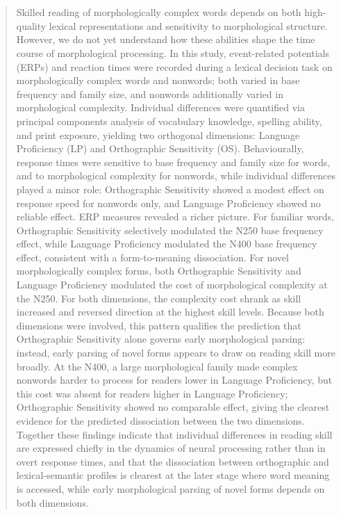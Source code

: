 \documentclass[utf8]{FrontiersinHarvard} %
\begin{document}
	
\begin{abstract}
		
	\section{}
	Skilled reading of morphologically complex words depends on both high-quality lexical representations and sensitivity to morphological structure. However, we do not yet understand how these abilities shape the time course of morphological processing. In this study, event-related potentials (ERPs) and reaction times were recorded during a lexical decision task on morphologically complex words and nonwords; both varied in base frequency and family size, and nonwords additionally varied in morphological complexity. Individual differences were quantified via principal components analysis of vocabulary knowledge, spelling ability, and print exposure, yielding two orthogonal dimensions: Language Proficiency (LP) and Orthographic Sensitivity (OS). Behaviourally, response times were sensitive to base frequency and family size for words, and to morphological complexity for nonwords, while individual differences played a minor role: Orthographic Sensitivity showed a modest effect on response speed for nonwords only, and Language Proficiency showed no reliable effect. ERP measures revealed a richer picture. For familiar words, Orthographic Sensitivity selectively modulated the N250 base frequency effect, while Language Proficiency modulated the N400 base frequency effect, consistent with a form-to-meaning dissociation. For novel morphologically complex forms, both Orthographic Sensitivity and Language Proficiency modulated the cost of morphological complexity at the N250. For both dimensions, the complexity cost shrank as skill increased and reversed direction at the highest skill levels. Because both dimensions were involved, this pattern qualifies the prediction that Orthographic Sensitivity alone governs early morphological parsing: instead, early parsing of novel forms appears to draw on reading skill more broadly. At the N400, a large morphological family made complex nonwords harder to process for readers lower in Language Proficiency, but this cost was absent for readers higher in Language Proficiency; Orthographic Sensitivity showed no comparable effect, giving the clearest evidence for the predicted dissociation between the two dimensions. Together these findings indicate that individual differences in reading skill are expressed chiefly in the dynamics of neural processing rather than in overt response times, and that the dissociation between orthographic and lexical-semantic profiles is clearest at the later stage where word meaning is accessed, while early morphological parsing of novel forms depends on both dimensions.
		

\end{abstract}
\end{document}
